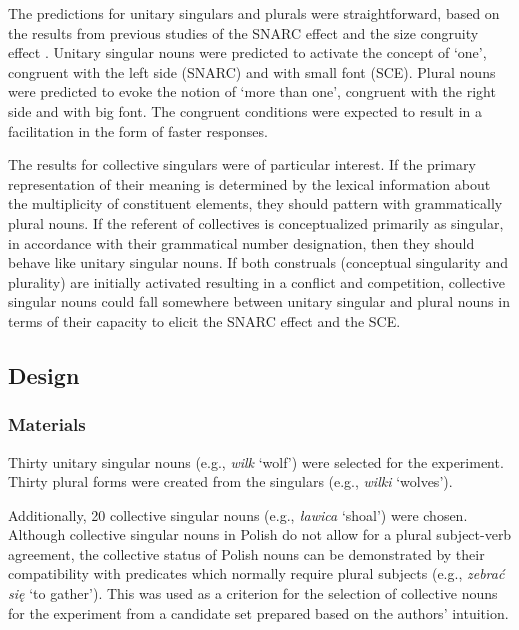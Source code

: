 \documentclass[output=paper]{langscibook}
\begin{document}
The predictions for unitary singulars and plurals were straightforward, based on the results from previous studies of the SNARC effect \citep[e.g.,][]{rottgerGrammaticalNumberElicits2015} and the size congruity effect \citep[e.g.,][]{henikThreeGreaterFive1982}. Unitary singular nouns were predicted to activate the concept of `one', congruent with the left side (SNARC) and with small font (SCE). Plural nouns were predicted to evoke the notion of `more than one', congruent with the right side and with big font. The congruent conditions were expected to result in a facilitation in the form of faster responses.

The results for collective singulars were of particular interest. If the primary representation of their meaning is determined by the lexical information about the multiplicity of constituent elements, they should pattern with grammatically plural nouns. If the referent of collectives is conceptualized primarily as singular, in accordance with their grammatical number designation, then they should behave like unitary singular nouns. If both construals (conceptual singularity and plurality) are initially activated resulting in a conflict and competition, collective singular nouns could fall somewhere between unitary singular and plural nouns in terms of their capacity to elicit the SNARC effect and the SCE.

\subsection{Design}

\subsubsection{Materials}
Thirty unitary singular nouns (e.g., \textit{wilk} ‘wolf’) were selected for the experiment. Thirty plural forms were created from the singulars (e.g., \textit{wilki} ‘wolves’). 

Additionally, 20 collective singular nouns (e.g., \textit{ławica} ‘shoal’) were chosen. Although collective singular nouns in Polish do not allow for a plural subject-verb agreement, the collective status of Polish nouns can be demonstrated by their compatibility with predicates which normally require plural subjects (e.g., \textit{zebrać się} ‘to gather’). This was used as a criterion for the selection of collective nouns for the experiment from a candidate set prepared based on the authors' intuition.
\end{document}
